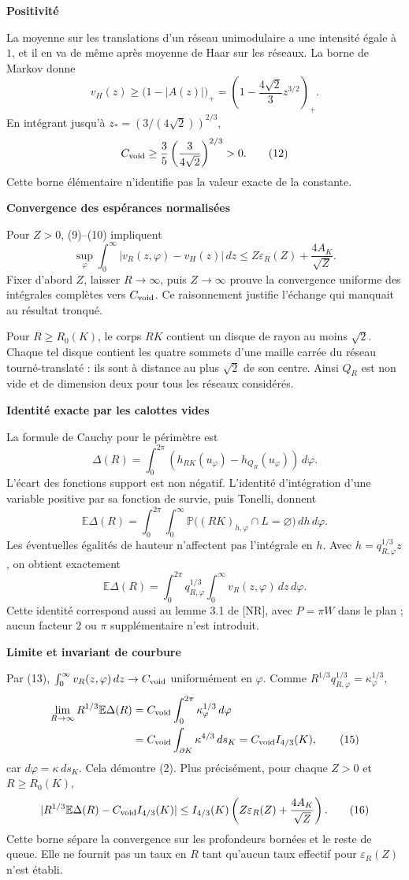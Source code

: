 \documentclass[11pt,a4paper]{article}
\newcommand{\E}{\mathbb E}\newcommand{\Prb}{\mathbb P}
\newcommand{\area}[1]{\lvert #1\rvert}
\newcommand{\head}[1]{\vspace{3pt}{\large\bfseries\color{navy}#1}\par}
\newcommand{\subhead}[1]{{\bfseries\color{navy}#1}\par}
\begin{document}
\subhead{Positivité}
La moyenne sur les translations d'un réseau unimodulaire a une intensité égale à $1$, et il en va de même après moyenne de Haar sur les réseaux. La borne de Markov donne
\[
 v_H(z)\ge\bigl(1-\area{A(z)}\bigr)_+
 =\left(1-\frac{4\sqrt2}{3}z^{3/2}\right)_+.
\]
En intégrant jusqu'à $z_*=(3/(4\sqrt2))^{2/3}$,
\[
 C_{\rm void}\ge\frac35\left(\frac3{4\sqrt2}\right)^{2/3}>0.
 \tag{12}
\]
Cette borne élémentaire n'identifie pas la valeur exacte de la constante.

\subhead{Convergence des espérances normalisées}
Pour $Z>0$, (9)--(10) impliquent
\[
 \sup_\varphi\int_0^\infty|v_R(z,\varphi)-v_H(z)|\,dz
 \le Z\varepsilon_R(Z)+\frac{4A_K}{\sqrt Z}.
 \tag{13}
\]
Fixer d'abord $Z$, laisser $R\to\infty$, puis $Z\to\infty$ prouve la convergence uniforme des intégrales complètes vers $C_{\rm void}$. Ce raisonnement justifie l'échange qui manquait au résultat tronqué.

\newpage
\head{5. Passage au déficit de périmètre complet}
Pour $R\ge R_0(K)$, le corps $RK$ contient un disque de rayon au moins $\sqrt2$. Chaque tel disque contient les quatre sommets d'une maille carrée du réseau tourné-translaté : ils sont à distance au plus $\sqrt2$ de son centre. Ainsi $Q_R$ est non vide et de dimension deux pour tous les réseaux considérés.

\subhead{Identité exacte par les calottes vides}
La formule de Cauchy pour le périmètre est
\[
 \Delta(R)=\int_0^{2\pi}
       (h_{RK}(u_\varphi)-h_{Q_R}(u_\varphi))\,d\varphi.
\]
L'écart des fonctions support est non négatif. L'identité d'intégration d'une variable positive par sa fonction de survie, puis Tonelli, donnent
\[
 \E\Delta(R)=\int_0^{2\pi}\int_0^\infty
       \Prb\bigl((RK)_{h,\varphi}\cap L=\varnothing\bigr)\,dh\,d\varphi.
\]
Les éventuelles égalités de hauteur n'affectent pas l'intégrale en $h$. Avec $h=q_{R,\varphi}^{1/3}z$, on obtient exactement
\[
 \E\Delta(R)=\int_0^{2\pi}q_{R,\varphi}^{1/3}
                  \int_0^\infty v_R(z,\varphi)\,dz\,d\varphi.
 \tag{14}
\]
Cette identité correspond aussi au lemme 3.1 de [NR], avec $P=\pi W$ dans le plan ; aucun facteur $2$ ou $\pi$ supplémentaire n'est introduit.

\subhead{Limite et invariant de courbure}
Par (13), $\int_0^\infty v_R(z,\varphi)\,dz\to C_{\rm void}$ uniformément en $\varphi$. Comme $R^{1/3}q_{R,\varphi}^{1/3}=\kappa_\varphi^{1/3}$,
\begin{align*}
 \lim_{R\to\infty}R^{1/3}\E\Delta(R)
 &=C_{\rm void}\int_0^{2\pi}\kappa_\varphi^{1/3}\,d\varphi\\
 &=C_{\rm void}\int_{\partial K}\kappa^{4/3}\,ds_K
 =C_{\rm void}I_{4/3}(K),
 \tag{15}
\end{align*}
car $d\varphi=\kappa\,ds_K$. Cela démontre (2). Plus précisément, pour chaque $Z>0$ et $R\ge R_0(K)$,
\[
 |R^{1/3}\E\Delta(R)-C_{\rm void}I_{4/3}(K)|
 \le I_{4/3}(K)\left(Z\varepsilon_R(Z)+\frac{4A_K}{\sqrt Z}\right).
 \tag{16}
\]
Cette borne sépare la convergence sur les profondeurs bornées et le reste de queue. Elle ne fournit pas un taux en $R$ tant qu'aucun taux effectif pour $\varepsilon_R(Z)$ n'est établi.
\end{document}
